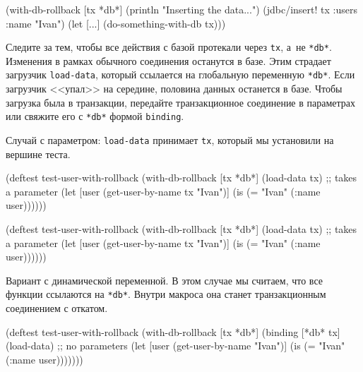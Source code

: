 \else

\begin{english}
  \begin{clojure}
(with-db-rollback [tx *db*]
  (println "Inserting the data...")
  (jdbc/insert! tx :users {:name "Ivan"})
  (let [...]
    (do-something-with-db tx)))
  \end{clojure}
\end{english}

\fi

Следите за тем, чтобы все действия с базой протекали через \verb|tx|, а~не
\verb|*db*|. Изменения в рамках обычного соединения останутся в базе. Этим
страдает загрузчик \verb|load-data|, который ссылается на глобальную переменную
\verb|*db*|. Если загрузчик <<упал>> на середине, половина данных останется в
базе. Чтобы загрузка была в транзакции, передайте транзакционное соединение в
параметрах или свяжите его с \verb|*db*| формой \verb|binding|.

Случай с параметром: \verb|load-data| принимает \verb|tx|, который мы
установили на вершине теста.

\ifnarrow

\begin{english}
  \begin{clojure}
(deftest test-user-with-rollback
  (with-db-rollback [tx *db*]
    (load-data tx) ;; takes a parameter
    (let [user
          (get-user-by-name tx "Ivan")]
      (is (= "Ivan" (:name user))))))
  \end{clojure}
\end{english}

\else

\begin{english}
  \begin{clojure}
(deftest test-user-with-rollback
  (with-db-rollback [tx *db*]
    (load-data tx) ;; takes a parameter
    (let [user (get-user-by-name tx "Ivan")]
      (is (= "Ivan" (:name user))))))
  \end{clojure}
\end{english}

\fi


Вариант с динамической переменной. В этом случае мы считаем, что все функции
ссылаются на \verb|*db*|. Внутри макроса она станет транзакционным соединением
с откатом.

\ifnarrow

\begin{english}
  \begin{clojure}
(deftest test-user-with-rollback
  (with-db-rollback [tx *db*]
    (binding [*db* tx]
      (load-data) ;; no parameters
      (let [user
            (get-user-by-name "Ivan")]
        (is (= "Ivan" (:name user)))))))
  \end{clojure}
\end{english}

